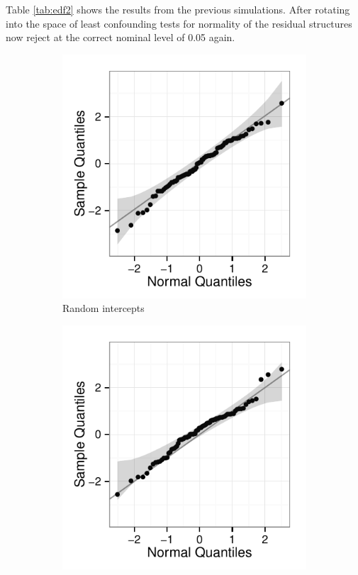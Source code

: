 \documentclass{article} %
\begin{document}
Table \ref{tab:edf2} shows the results from the previous simulations. After rotating into the space of least confounding tests for normality of the residual structures now  reject at the correct nominal level of 0.05 again.

\begin{figure}[htb]
	\centering
	  \begin{subfigure}[b]{0.3\linewidth}
		\includegraphics[width=\linewidth]{lcr-intercept-qq.pdf}
		\caption{Random intercepts}
	  \end{subfigure}	
	  \begin{subfigure}[b]{0.3\linewidth}
	\includegraphics[width=\linewidth]{lcr-slope-qq.pdf}

\end{subfigure}
\end{figure}
\end{document}
